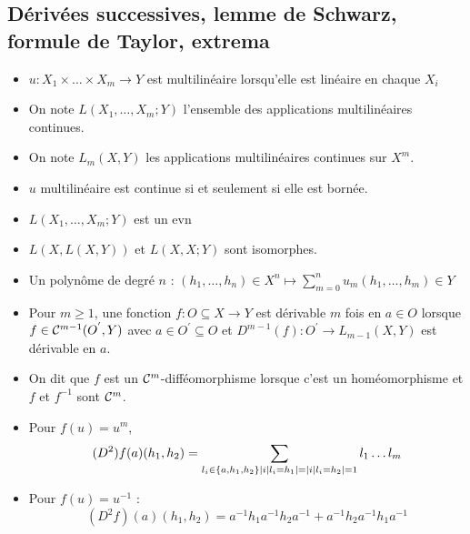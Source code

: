 \documentclass{cours}
\begin{document}
\subsection{Dérivées successives, lemme de Schwarz, formule de Taylor, extrema}
\begin{definition}
    \begin{itemize}
        \item $u : X_{1} \times \ldots \times X_{m} \rightarrow Y$ est multilinéaire lorsqu'elle est linéaire en chaque $X_{i}$
        \item On note $L(X_{1}, \ldots, X_{m}; Y)$ l'ensemble des applications multilinéaires continues. 
        \item On note $L_{m}(X, Y)$ les applications multilinéaires continues sur $X^{m}$.
    \end{itemize}
\end{definition}

\begin{remark}
    \begin{itemize}
        \item $u$ multilinéaire est continue si et seulement si elle est bornée. 
        \item $L(X_{1}, \ldots, X_{m}; Y)$ est un evn
        \item $L(X, L(X, Y))$ et $L(X, X; Y)$ sont isomorphes.
        \item Un polynôme de degré $n$ : $(h_{1}, \ldots, h_{n}) \in X^{n} \mapsto \sum_{m = 0}^{n} u_{m}(h_{1}, \ldots, h_{m}) \in Y$
    \end{itemize}
\end{remark}

\begin{definition}
    \begin{itemize}
        \item Pour $m \geq 1$, une fonction $f : O\subseteq X \rightarrow Y$ est dérivable $m$ fois en $a \in O$ lorsque $f \in \mathcal{C}^{m - 1}(O^{'}, Y)$ avec $a \in O^{'} \subseteq O$ et $D^{m - 1}(f) : O^{'} \rightarrow L_{m - 1}(X, Y)$ est dérivable en $a$.
        \item On dit que $f$ est un $\mathcal{C}^{m}$-difféomorphisme lorsque c'est un homéomorphisme et $f$ et $f^{-1}$ sont $\mathcal{C}^{m}$.
    \end{itemize}
\end{definition}

\begin{proposition}
    \begin{itemize}
        \item Pour $f(u) = u^{m}$, 
        \[
            (D^{2})f(a)(h_{1}, h_{2}) = \sum_{l_{i} \in \left\{a, h_{1}, h_{2}\right\}\\ \left|i \mid l_{i} = h_{1}\right| = \left|i \mid l_{i} = h_{2}\right| = 1} l_{1}\ldots l_{m}
        \]
        \item Pour $f(u) = u^{-1}$ :
        \[
            (D^{2}f)(a)(h_{1}, h_{2}) = a^{-1}h_{1}a^{-1}h_{2}a^{-1} + a^{-1}h_{2}a^{-1}h_{1}a^{-1}
        \]
    \end{itemize}
\end{proposition}
\end{document}
